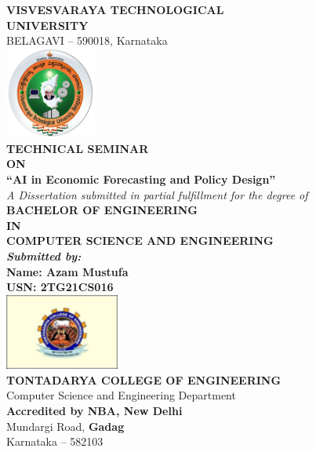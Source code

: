 \begin{titlepage}
    \centering

    {\LARGE \bfseries VISVESVARAYA TECHNOLOGICAL}\\[0.2cm]
    {\LARGE \bfseries UNIVERSITY}\\[0.2cm]
    {\large BELAGAVI – 590018, Karnataka}\\[1cm]

    \includegraphics[height=3cm]{images/vtu.png}\\[1cm]

    {\Large \bfseries TECHNICAL SEMINAR}\\[0.3cm]
    {\large \bfseries ON}\\[0.3cm]

    {\LARGE \bfseries ``AI in Economic Forecasting and}
    {\LARGE \bfseries Policy Design''}\\[0.3cm]

    {\itshape A Dissertation submitted in partial fulfillment for the degree of}\\[0.2cm]

    {\large \bfseries BACHELOR OF ENGINEERING}\\
    {\large \bfseries IN}\\
    {\large \bfseries COMPUTER SCIENCE AND ENGINEERING}\\[1cm]

    \textbf{\textit{Submitted by:}}\\[0.2cm]
    \textbf{Name: Azam Mustufa}\\
    \textbf{USN: 2TG21CS016}\\[0.8cm]

    \includegraphics[height=2.5cm]{images/tce.png}\\[1cm]

    {\bfseries TONTADARYA COLLEGE OF ENGINEERING}\\
    Computer Science and Engineering Department\\[0.3cm]

    \textbf{Accredited by NBA, New Delhi}\\
    Mundargi Road, \textbf{Gadag}\\
    Karnataka – 582103

\end{titlepage}